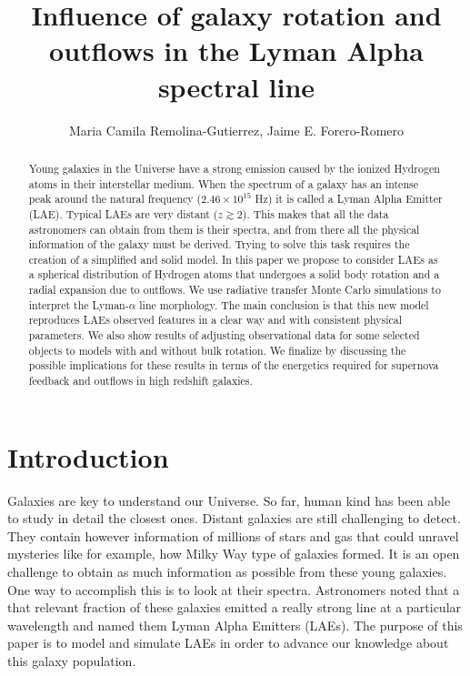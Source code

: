\documentclass[twocolappendix]{latex/emulateapj}
\begin{document}
\title{Influence of galaxy rotation and outflows in the Lyman Alpha spectral line}


\author{Maria Camila Remolina-Gutierrez, Jaime E. Forero-Romero} 


\begin{abstract}
\noindent Young galaxies in the Universe have a strong \lya emission caused by the ionized Hydrogen atoms in their interstellar medium. When the spectrum of a galaxy has an intense peak around the \lya natural frequency ($2.46\times 10^{15}$ Hz) it is called a Lyman Alpha Emitter (LAE). Typical LAEs are very distant ($z \gtrsim 2$). This makes that all the data astronomers can obtain from them is their spectra, and from there all the physical information of the galaxy must be derived. Trying to solve this task requires the creation of a simplified and solid model. In this paper we propose to consider LAEs as a spherical distribution of Hydrogen atoms that undergoes a solid body rotation and a radial expansion due to outflows. We use radiative transfer Monte Carlo simulations to interpret the Lyman-$\alpha$ line morphology. The main conclusion is that this new model reproduces LAEs observed features in a clear way and with consistent physical parameters. We also show results of adjusting observational data for some selected objects to models with and without bulk rotation. We finalize by discussing the possible implications for these results in terms of the energetics required for supernova feedback and outflows in high redshift galaxies. \\
\end{abstract}

\section{Introduction}
\label{sec:intro}

Galaxies are key to understand our Universe. So far, human kind has been able to study in detail the closest ones. Distant galaxies are still challenging to detect. They contain however information of millions of stars and gas that could unravel mysteries like for example, how Milky Way type of galaxies formed. It is an open challenge to obtain as much information as possible from these young galaxies. One way to accomplish this is to look at their spectra. Astronomers noted that a that relevant fraction of these galaxies emitted a really strong line at a particular wavelength and named them Lyman Alpha Emitters (LAEs). The purpose of this paper is to model and simulate LAEs in order to advance our knowledge about this galaxy population. \\
\end{document}
